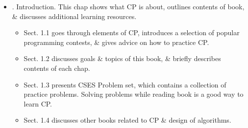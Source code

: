 \documentclass{article}
\begin{document}
\begin{itemize}
	{\bf Topics \& features.}
	\begin{enumerate}
		\item Introduces dynamic programming \& other fundamental algorithm design techniques, \& investigates a wide selection of graph algorithms
		\item Compatible with IOI Syllabus, yet also covering more advanced topics, e.g. maximum flows, Nim theory, \& suffix structures
		\item Provides advice for students aiming for IOI contest
		\item Surveys specialized algorithms for trees, \& discusses mathematical topics that are relevant in CP
		\item Examines use of Python language in CP
		\item Discusses sorting algorithms \& binary search, \& examines a selection of data structures of C++ standard library
		\item Explores how GenAI will impact on future of field
		\item Covers such advanced algorithm design topics as bit-parallelism \& amortized analysis, \& presents a focus on efficiently processing array range queries
		\item Describes a selection of more advanced topics, including square-root algorithms \& DP optimization
	\end{enumerate}
	Fully updated, expanded \& easy to follow, this core textbook{\tt/}guide is an ideal reference for all students needing to learn algorithms \& to practice for programming contests. Knowledge of programming basics is assumed, but prev background in algorithm design or programming contests is not necessary. With its breadth of topics, examples, \& references, book is eminently suitable for both beginners \& more experienced readers alike.
	\item {. Introduction.} This chap shows what CP is about, outlines contents of book, \& discusses additional learning resources.
	\begin{itemize}
		\item Sect. 1.1 goes through elements of CP, introduces a selection of popular programming contests, \& gives advice on how to practice CP.
		\item Sect. 1.2 discusses goals \& topics of this book, \& briefly describes contents of each chap.
		\item Sect. 1.3 presents CSES Problem set, which contains a collection of practice problems. Solving problems while reading book is a good way to learn CP.
		\item Sect. 1.4 discusses other books related to CP \& design of algorithms.
	\end{itemize}
	

\end{itemize}
\end{document}
